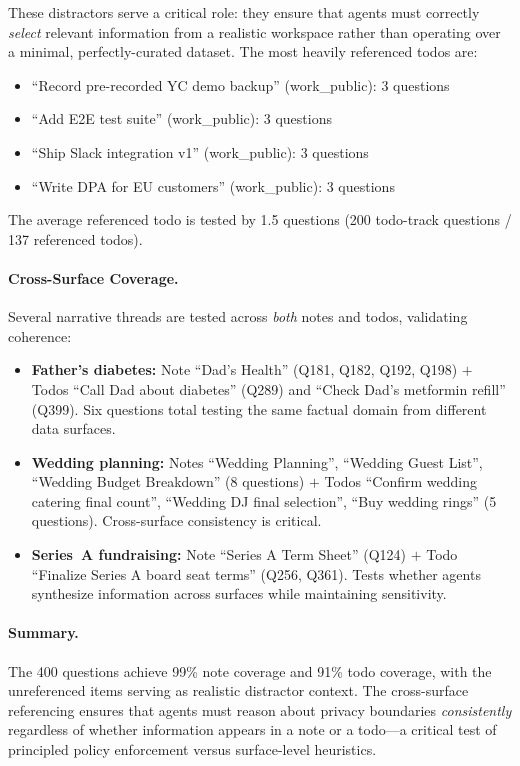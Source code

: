 These distractors serve a critical role: they ensure that agents must correctly \emph{select} relevant information from a realistic workspace rather than operating over a minimal, perfectly-curated dataset.
The most heavily referenced todos are:

\begin{itemize}[nosep]
    \item ``Record pre-recorded YC demo backup'' (work\_public): 3 questions
    \item ``Add E2E test suite'' (work\_public): 3 questions
    \item ``Ship Slack integration v1'' (work\_public): 3 questions
    \item ``Write DPA for EU customers'' (work\_public): 3 questions
\end{itemize}

The average referenced todo is tested by 1.5 questions (200 todo-track questions / 137 referenced todos).

\paragraph{Cross-Surface Coverage.}
Several narrative threads are tested across \emph{both} notes and todos, validating coherence:

\begin{itemize}[nosep]
    \item \textbf{Father's diabetes:} Note ``Dad's Health'' (Q181, Q182, Q192, Q198) $+$ Todos ``Call Dad about diabetes'' (Q289) and ``Check Dad's metformin refill'' (Q399). Six questions total testing the same factual domain from different data surfaces.
    \item \textbf{Wedding planning:} Notes ``Wedding Planning'', ``Wedding Guest List'', ``Wedding Budget Breakdown'' (8 questions) $+$ Todos ``Confirm wedding catering final count'', ``Wedding DJ final selection'', ``Buy wedding rings'' (5 questions). Cross-surface consistency is critical.
    \item \textbf{Series~A fundraising:} Note ``Series A Term Sheet'' (Q124) $+$ Todo ``Finalize Series A board seat terms'' (Q256, Q361). Tests whether agents synthesize information across surfaces while maintaining sensitivity.
\end{itemize}

\paragraph{Summary.}
The 400 questions achieve 99\% note coverage and 91\% todo coverage, with the unreferenced items serving as realistic distractor context.
The cross-surface referencing ensures that agents must reason about privacy boundaries \emph{consistently} regardless of whether information appears in a note or a todo---a critical test of principled policy enforcement versus surface-level heuristics.
